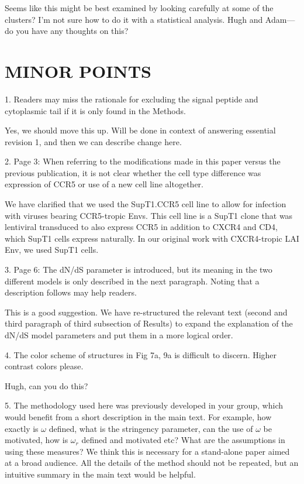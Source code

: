 \documentclass[11pt, oneside]{article}   	%
\begin{document}
{\color{red}
Seems like this might be best examined by looking carefully at some of the clusters?
I'm not sure how to do it with a statistical analysis.
Hugh and Adam---do you have any thoughts on this?
}

\section*{MINOR POINTS}

1. Readers may miss the rationale for excluding the signal peptide and cytoplasmic tail if it is only found in the Methods. 

{\color{red}Yes, we should move this up. Will be done in context of answering essential revision 1, and then we can describe change here.}

2. Page 3: When referring to the modifications made in this paper versus the previous publication, it is not clear whether the cell type difference was expression of CCR5 or use of a new cell line altogether. 

{\color{black}
We have clarified that we used the SupT1.CCR5 cell line to allow for infection with viruses bearing CCR5-tropic Envs. This cell line is a SupT1 clone that was lentiviral transduced to also express CCR5 in addition to CXCR4 and CD4, which SupT1 cells express naturally. In our original work with CXCR4-tropic LAI Env, we used SupT1 cells. 
}

3. Page 6: The dN/dS parameter is introduced, but its meaning in the two different models is only described in the next paragraph. Noting that a description follows may help readers. 

{\color{black}
This is a good suggestion.
We have re-structured the relevant text (second and third paragraph of third subsection of Results) to expand the explanation of the dN/dS model parameters and put them in a more logical order.}

4. The color scheme of structures in Fig 7a, 9a is difficult to discern. Higher contrast colors please. 

{\color{red}
Hugh, can you do this?}

5. The methodology used here was previously developed in your group, which would benefit from a short description in the main text. For example, how exactly is $\omega$ defined, what is the stringency parameter, can the use of $\omega$ be motivated, how is $\omega_r$ defined and motivated etc? What are the assumptions in using these measures? We think this is necessary for a stand-alone paper aimed at a broad audience. All the details of the method should not be repeated, but an intuitive summary in the main text would be helpful. 
\end{document}
